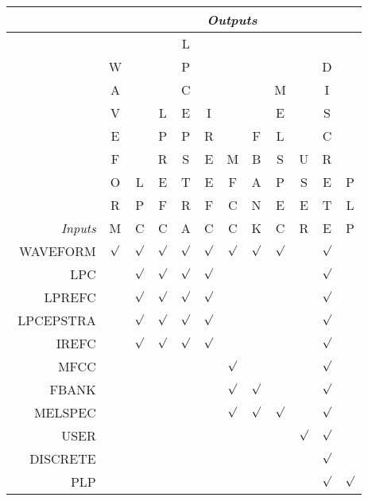 \begin{center}
\begin{tabular}{|r||ccccccccccc|} \cline{2-12}
 \multicolumn{1}{c}{} & \multicolumn{11}{|c|}{\it Outputs } \\
\cline{2-11} \cline{2-11} \hline
          ~ & ~ & ~ & ~ & L  & ~ & ~ & ~ & ~ & ~ & ~ & ~ \\ 
          ~ & W & ~ & ~ & P  & ~ & ~ & ~ & ~ & ~ & D & ~ \\ 
          ~ & A & ~ & ~ & C  & ~ & ~ & ~ & M & ~ & I & ~ \\ 
          ~ & V & ~ & L & E  & I & ~ & ~ & E & ~ & S & ~ \\ 
          ~ & E & ~ & P & P  & R & ~ & F & L & ~ & C & ~ \\ 
          ~ & F & ~ & R & S  & E & M & B & S & U & R & ~ \\ 
          ~ & O & L & E & T  & E & F & A & P & S & E & P \\ 
          ~ & R & P & F & R  & F & C & N & E & E & T  & L \\ 
{\it Inputs} & M & C & C & A  & C & C & K & C & R & E & P \\ \hline 
~WAVEFORM & $\surd$ & $\surd$ & $\surd$ & $\surd$  &$\surd$& $\surd$ & $\surd$ & $\surd$ & ~ &$\surd$ & ~\\ 
~~~~~~LPC & ~ & $\surd$ & $\surd$ & $\surd$  &$\surd$& ~ & ~ & ~ & ~ &$\surd$ & ~\\ 
~~~LPREFC & ~ & $\surd$ & $\surd$ & $\surd$  &$\surd$& ~ & ~ & ~ & ~ &$\surd$& ~\\
LPCEPSTRA & ~ & $\surd$ & $\surd$ & $\surd$  &$\surd$& ~ & ~ & ~ & ~ &$\surd$& ~\\
~~~~IREFC & ~ & $\surd$ & $\surd$ & $\surd$  &$\surd$& ~ & ~ & ~ & ~ &$\surd$& ~\\
~~~~~MFCC & ~ & ~ & ~ &  ~ & ~ & $\surd$ & ~ & ~ & ~ &$\surd$& ~\\ 
~~~~FBANK & ~ & ~ & ~ &  ~ & ~ & $\surd$ & $\surd$ & ~ & ~ &$\surd$& ~\\
~~MELSPEC & ~ & ~ & ~ &  ~ & ~ & $\surd$ & $\surd$ & $\surd$ & ~ &$\surd$& ~\\
~~~~~USER & ~ & ~ & ~ &  ~ & ~ & ~ & ~ & ~ & $\surd$ &$\surd$ & ~\\
~DISCRETE & ~ & ~ & ~ &  ~ & ~ & ~ & ~ & ~ & ~ & $\surd$ & ~ \\ 
~~~~~~PLP & ~ & ~ & ~ &  ~ & ~ & ~ & ~ & ~ & ~ & $\surd$ & $\surd$ \\ 
\hline
\end{tabular}
\end{center}

